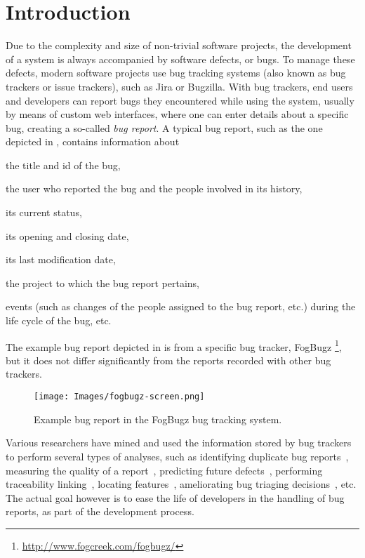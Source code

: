 \section{Introduction}

Due to the complexity and size of non-trivial software projects, the development of a system is always accompanied by software defects, or bugs. To manage these defects, modern software projects use bug tracking systems (also known as bug trackers or issue trackers), such as Jira or Bugzilla. With bug trackers, end users and developers can report bugs they encountered while using the system, usually by means of custom web interfaces, where one can enter details about a specific bug, creating a so-called \emph{bug report}. A typical bug report, such as the one depicted in , contains information about \begin{inparaenum}[(1)] \item the title and id of the bug, \item the user who reported the bug and the people involved in its history, \item its current status, \item its opening and closing date, \item its last modification date, \item the project to which the bug report pertains, \item events (such as changes of the people assigned to the bug report, etc.) during the life cycle of the bug, etc. \end{inparaenum} The example bug report depicted in  is from a specific bug tracker, FogBugz \footnote{\url{http://www.fogcreek.com/fogbugz/}}, but it does not differ significantly from the reports recorded with other bug trackers.

\begin{figure}[ht]
\centering
\texttt{[image: Images/fogbugz-screen.png]}
\caption{Example bug report in the FogBugz bug tracking system.}
\label{fogbugz-example}
\end{figure}

Various researchers have mined and used the information stored by bug trackers to perform several types of analyses, such as identifying duplicate bug reports~\cite{Wang2008a}, measuring the quality of a report~\cite{Bettenburg08}, predicting future defects~\cite{DAmb2012a}, performing traceability linking~\cite{Biss2013a}, locating features~\cite{Dit2013a}, ameliorating bug triaging decisions~\cite{Anvi2006a}, etc. The actual goal however is to ease the life of developers in the handling of bug reports, as part of the development process.

